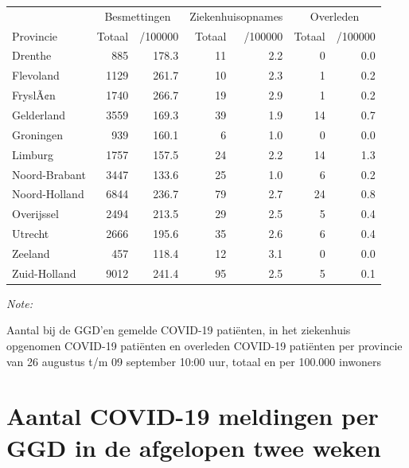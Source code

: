 \documentclass[
  english,
  man,floatsintext]{apa6}
\begin{document}
\begin{table}
\centering
\begin{threeparttable}
\begin{tabular}{lrrrrrr}
\toprule
\multicolumn{1}{c}{ } & \multicolumn{2}{c}{Besmettingen} & \multicolumn{2}{c}{Ziekenhuisopnames} & \multicolumn{2}{c}{Overleden} \\
\cmidrule(l{3pt}r{3pt}){2-3} \cmidrule(l{3pt}r{3pt}){4-5} \cmidrule(l{3pt}r{3pt}){6-7}
Provincie & Totaal & /100000 & Totaal & /100000 & Totaal & /100000\\
\midrule
Drenthe & 885 & 178.3 & 11 & 2.2 & 0 & 0.0\\
Flevoland & 1129 & 261.7 & 10 & 2.3 & 1 & 0.2\\
FryslÃ¢n & 1740 & 266.7 & 19 & 2.9 & 1 & 0.2\\
Gelderland & 3559 & 169.3 & 39 & 1.9 & 14 & 0.7\\
Groningen & 939 & 160.1 & 6 & 1.0 & 0 & 0.0\\
Limburg & 1757 & 157.5 & 24 & 2.2 & 14 & 1.3\\
Noord-Brabant & 3447 & 133.6 & 25 & 1.0 & 6 & 0.2\\
Noord-Holland & 6844 & 236.7 & 79 & 2.7 & 24 & 0.8\\
Overijssel & 2494 & 213.5 & 29 & 2.5 & 5 & 0.4\\
Utrecht & 2666 & 195.6 & 35 & 2.6 & 6 & 0.4\\
Zeeland & 457 & 118.4 & 12 & 3.1 & 0 & 0.0\\
Zuid-Holland & 9012 & 241.4 & 95 & 2.5 & 5 & 0.1\\
\bottomrule
\end{tabular}
\begin{tablenotes}
\item \textit{Note: } 
\item Aantal bij de GGD’en gemelde COVID-19 patiënten, in het ziekenhuis opgenomen COVID-19 patiënten en overleden COVID-19 patiënten per provincie van 26 augustus t/m 09 september 10:00 uur, totaal en per 100.000 inwoners
\end{tablenotes}
\end{threeparttable}
\end{table}

\newpage

\hypertarget{aantal-covid-19-meldingen-per-ggd-in-de-afgelopen-twee-weken}{%
\section{Aantal COVID-19 meldingen per GGD in de afgelopen twee weken}\label{aantal-covid-19-meldingen-per-ggd-in-de-afgelopen-twee-weken}}
\end{document}
